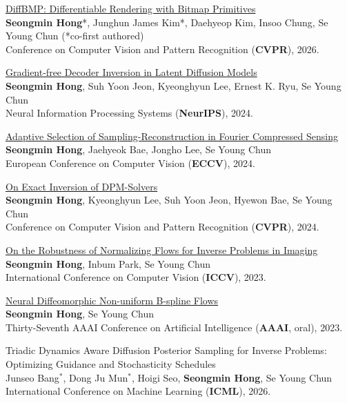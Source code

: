 \begin{cvcontent}
\href{https://diffbmp.com/}{DiffBMP: Differentiable Rendering with Bitmap Primitives}\\
\textbf{Seongmin Hong}*, Junghun James Kim*, Daehyeop Kim, Insoo Chung, Se Young Chun (*co-first authored)\\
Conference on Computer Vision and Pattern Recognition (\textbf{CVPR}), 2026.

\href{https://smhongok.github.io/dec-inv.html}{Gradient-free Decoder Inversion in Latent Diffusion Models}\\
\textbf{Seongmin Hong}, Suh Yoon Jeon, Kyeonghyun Lee, Ernest K. Ryu, Se Young Chun\\
Neural Information Processing Systems (\textbf{NeurIPS}), 2024.

\href{https://smhongok.github.io/ada-sel.html}{Adaptive Selection of Sampling-Reconstruction in Fourier Compressed Sensing}\\
\textbf{Seongmin Hong}, Jaehyeok Bae, Jongho Lee, Se Young Chun\\
European Conference on Computer Vision (\textbf{ECCV}), 2024.

\href{https://smhongok.github.io/inv-dpm.html}{On Exact Inversion of DPM-Solvers}\\
\textbf{Seongmin Hong}, Kyeonghyun Lee, Suh Yoon Jeon, Hyewon Bae, Se Young Chun\\
Conference on Computer Vision and Pattern Recognition (\textbf{CVPR}), 2024.

\href{https://smhongok.github.io/robustness.html}{On the Robustness of Normalizing Flows for Inverse Problems in Imaging}\\
\textbf{Seongmin Hong}, Inbum Park, Se Young Chun\\
International Conference on Computer Vision (\textbf{ICCV}), 2023.

\href{https://smhongok.github.io/nubsf.html}{Neural Diffeomorphic Non-uniform B-spline Flows}\\
\textbf{Seongmin Hong}, Se Young Chun\\
Thirty-Seventh AAAI Conference on Artificial Intelligence (\textbf{AAAI}, oral), 2023.

\end{cvcontent}
\begin{cvcontent}
Triadic Dynamics Aware Diffusion Posterior Sampling for Inverse Problems: Optimizing Guidance and Stochasticity Schedules\\
Junseo Bang$^*$, Dong Ju Mun$^*$, Hoigi Seo, \textbf{Seongmin Hong}, Se Young Chun\\
International Conference on Machine Learning (\textbf{ICML}), 2026.

\end{cvcontent}
